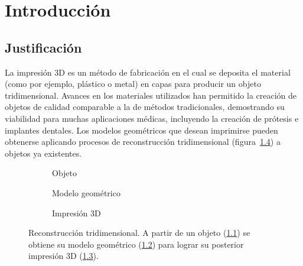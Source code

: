 \chapter{Introducción}

	\section{Justificación}
	La impresión 3D es un método de fabricación en el cual se deposita el material
	(como por ejemplo, plástico o metal) en capas para producir un objeto tridimensional.
	Avances en los materiales utilizados han permitido la creación de objetos
	de calidad comparable a la de métodos tradicionales,
	demostrando su viabilidad para muchas aplicaciones médicas,
	incluyendo la creación de prótesis e implantes dentales\cite{Schubert159}. %
	Los modelos geométricos que desean imprimirse pueden obtenerse aplicando procesos de
	reconstrucción tridimensional (figura~\ref{fig:ingenieria_inversa}) a objetos ya existentes.

	\begin{figure}
		\centering
		\begin{subfigure}{.3\linewidth}
			\caption{\label{fig:cara}Objeto}
		\end{subfigure}
		\begin{subfigure}{.3\linewidth}
			\caption{\label{fig:cara_3d}Modelo geométrico}
		\end{subfigure}
		\begin{subfigure}{.3\linewidth}
			\caption{\label{fig:cara_print_3d}Impresión 3D}
		\end{subfigure}
		\caption{\label{fig:ingenieria_inversa}Reconstrucción tridimensional.
		A partir de un objeto (\ref{fig:cara}) se obtiene su modelo geométrico (\ref{fig:cara_3d})
		para lograr su posterior impresión 3D (\ref{fig:cara_print_3d}).}
	\end{figure}

